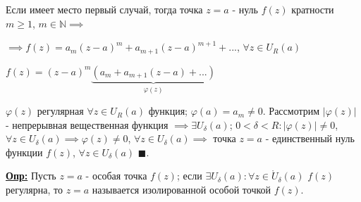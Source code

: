 \documentclass[a4paper, 12pt]{article}
\begin{document}
 \quad Если имеет место первый случай, тогда точка $z = a$ - нуль $f(z)$ кратности $m \geq 1$, $m \in \mathbb{N} \implies$ 
 \begin{center}
   $\implies f(z) = a_m (z-a)^m + a_{m+1} (z-a)^{m+1} + ... $, $\forall z \in U_R (a)$ 

   $f(z) = (z-a)^{m} \underbrace{(a_m + a_{m+1} (z-a) + ... )}_{\varphi (z)}$
 \end{center}

 \quad $\varphi (z)$ регулярная $\forall z \in U_R (a)$ функция; $\varphi (a) = a_m \neq 0$. Рассмотрим $|\varphi (z)|$ - непрерывная вещественная функция $\implies \exists U_{\delta} (a)$; $0 < \delta < R : |\varphi(z)| \neq 0$, $\forall z \in U_{\delta} (a) \implies \varphi(z) \neq 0$, $\forall z \in U_{\delta} (a) \implies$ точка $z = a$ - единственный нуль функции $f(z)$, $\forall z \in U_{\delta} (a)$ $\blacksquare$.

 \quad \textbf{\underline{Опр:}} Пусть $z = a$ - особая точка $f(z)$; если $\exists U_{\delta} (a) : \forall z \in \mathring{U}_{\delta} (a)$ $f(z)$ регулярна, то $z = a$ называется изолированной особой точкой $f(z)$.


 
\end{document}
